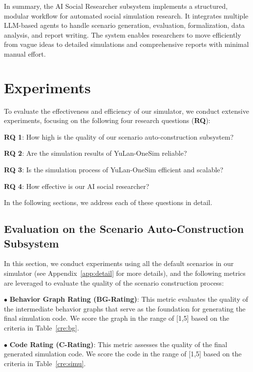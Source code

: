\documentclass{article}
\theoremstyle{definition}
\theoremstyle{theorem}
\theoremstyle{proof}
\theoremstyle{remark}
\begin{document}
    In summary, the AI Social Researcher subsystem implements a structured, modular workflow for automated social simulation research. It integrates multiple LLM-based agents to handle scenario generation, evaluation, formalization, data analysis, and report writing. The system enables researchers to move efficiently from vague ideas to detailed simulations and comprehensive reports with minimal manual effort.





    \section{Experiments}\label{sec4}
    To evaluate the effectiveness and efficiency of our simulator, we conduct extensive experiments, focusing on the following four research questions (\textbf{RQ}):
    
    \textbf{RQ 1}: How high is the quality of our scenario auto-construction subsystem?

    \textbf{RQ 2}: Are the simulation results of YuLan-OneSim reliable?

    \textbf{RQ 3}: Is the simulation process of YuLan-OneSim efficient and scalable?

    \textbf{RQ 4}: How effective is our AI social researcher?

    In the following sections, we address each of these questions in detail.

    \subsection{Evaluation on the Scenario Auto-Construction Subsystem}
    

    In this section, we conduct experiments using all the default scenarios in our simulator (see Appendix~\ref{app:detail} for more details), and the following metrics are leveraged to evaluate the quality of the scenario construction process:
    
    $\bullet$ \textbf{Behavior Graph Rating (BG-Rating)}: 
    This metric evaluates the quality of the intermediate behavior graphs that serve as the foundation for generating the final simulation code. 
    We score the graph in the range of [1,5] based on the criteria in {Table~\ref{cre:bg}}.

    $\bullet$ \textbf{Code Rating (C-Rating)}: 
    This metric assesses the quality of the final generated simulation code.
    We score the code in the range of [1,5] based on the criteria in {Table~\ref{cre:simu}}.
\end{document}
